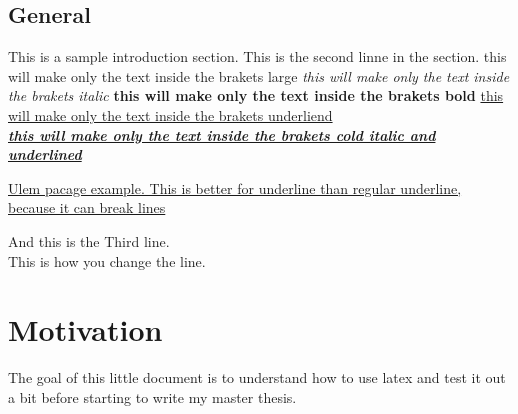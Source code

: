 \documentclass[16pt,a4paper]{article}
\begin{document}
\subsection{General} \label{sec:Mysec}
This is a sample introduction section. 
This is the second linne in the section. 
{\Large this will make only the text inside the brakets large}
\textit{ this will make only the text inside the brakets italic}
\textbf{ this will make only the text inside the brakets bold}
\underline{this will make only the text inside the brakets underliend} \\
\textbf{\textit{\underline{ this will make only the text inside the brakets cold italic and underlined }}}

\uline{Ulem pacage example. This is better for underline than regular underline, because it can break lines}





And this is the Third line. \\
This is how you change the line. 

\section{Motivation}
The goal of this little document is to understand how to use latex and test it out a bit before starting to write my master thesis. 

\pagebreak
\end{document}
